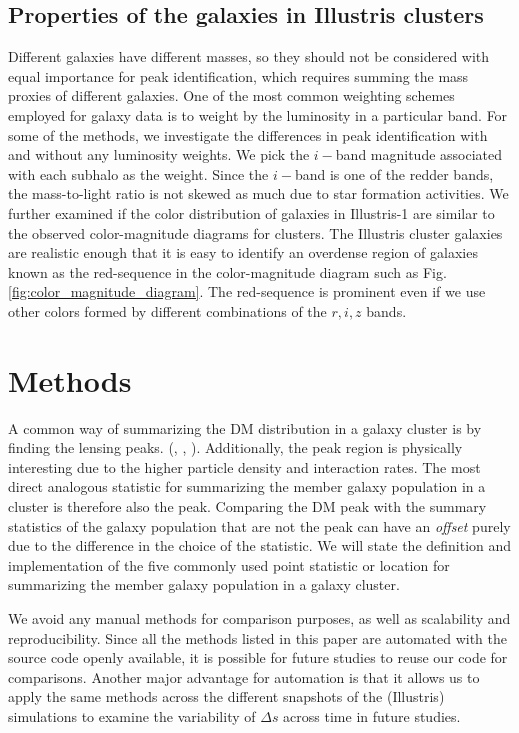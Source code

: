 \subsection{Properties of the galaxies in Illustris clusters}
\label{subsec:galaxy_properties}

Different galaxies have different masses, so they should not be considered with equal
importance for peak identification, which requires summing
the mass proxies of different galaxies. One of the most common weighting schemes employed for galaxy data is to weight
by the luminosity in a particular band. For some of the methods, we investigate
the differences in peak identification with and without any luminosity weights.
We pick the $i-$band magnitude
associated with each subhalo as the weight. Since the $i-$band is
one of the redder bands, the mass-to-light ratio is not skewed as much due to star
formation activities. 
We further examined if the color distribution of galaxies in Illustris-1 are
similar to the observed color-magnitude diagrams for clusters.
The Illustris cluster galaxies are realistic enough that it is easy to
identify an overdense region of galaxies known as the red-sequence in the 
color-magnitude diagram such as Fig.
\ref{fig:color_magnitude_diagram}. The red-sequence is prominent even if we
use other colors formed by different combinations of the $r, i, z$ bands.

\section{Methods}\label{sec:methods}
A common way of summarizing the DM distribution in a
galaxy cluster is by finding the lensing peaks.
(\citealt{Medezinski2013}, \citealt{Markevitch2004}, 
\citealt{Zitrin13}). 
Additionally, the peak region is physically 
interesting due to the higher particle density and interaction rates. 
The most direct analogous statistic for summarizing the member galaxy
population in a cluster is therefore also the peak. 
Comparing the DM peak with the summary statistics of the galaxy population that
are not the peak  can have an {\it offset} purely due to the difference in
the choice of the statistic. 
We will state the definition and implementation of the five commonly used 
point statistic or location for summarizing 
the member galaxy population in a galaxy cluster.

We avoid any manual methods for
comparison purposes, as well as scalability and reproducibility. 
Since all the methods listed in this
paper are automated with the source code openly available, 
it is possible for future studies to reuse our code for comparisons. 
Another major advantage for automation is that it allows us  
to apply
the same methods across the different snapshots of the (Illustris) simulations to
examine the variability of $\Delta s$ across time in future studies. 


